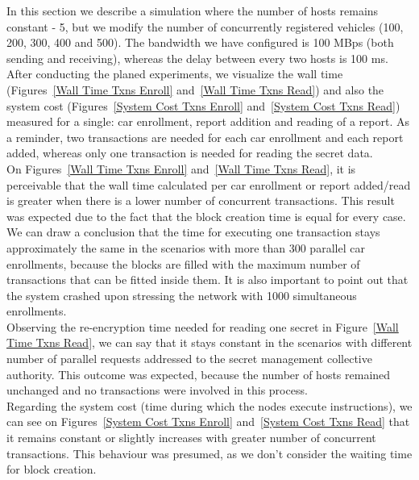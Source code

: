 In this section we describe a simulation where the number of hosts remains constant - 5, but we modify the number of concurrently registered vehicles (100, 200, 300, 400 and 500). The bandwidth we have configured is 100 MBps (both sending and receiving), whereas the delay between every two hosts is 100 ms.\\
\newline
After conducting the planed experiments, we visualize the wall time (Figures~\ref{Wall Time Txns Enroll} and~\ref{Wall Time Txns Read}) and also the system cost (Figures~\ref{System Cost Txns Enroll} and~\ref{System Cost Txns Read}) measured for a single: car enrollment, report addition and reading of a report.
As a reminder, two transactions are needed for each car enrollment and each report added, whereas only one transaction is needed for reading the secret data.\\
\newline
On Figures~\ref{Wall Time Txns Enroll} and~\ref{Wall Time Txns Read}, it is perceivable that the wall time calculated per car enrollment or report added/read is greater when there is a lower number of concurrent transactions. This result was expected due to the fact that the block creation time is equal for every case. We can draw a conclusion that the time for executing one transaction stays approximately the same in the scenarios with more than 300 parallel car enrollments, because the blocks are filled with the maximum number of transactions that can be fitted inside them. It is also important to point out that the system crashed upon stressing the network with 1000 simultaneous enrollments.\\
\newline
Observing the re-encryption time needed for reading one secret in Figure~\ref{Wall Time Txns Read}, we can say that it stays constant in the scenarios with different number of parallel requests addressed to the secret management collective authority. This outcome was expected, because the number of hosts remained unchanged and no transactions were involved in this process.\\
\newline
Regarding the system cost (time during which the nodes execute instructions), we can see on Figures~\ref{System Cost Txns Enroll} and~\ref{System Cost Txns Read} that it remains constant or slightly increases with greater number of concurrent transactions. This behaviour was presumed, as we don't consider the waiting time for block creation.
